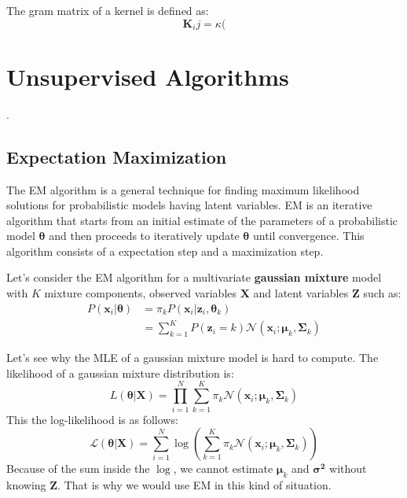 \documentclass[12pt]{report}
\begin{document}
        The gram matrix of a kernel is defined as:
        \begin{equation}
            \boldsymbol{K}_ij = \kappa(
        \end{equation}
            
        
    \section{Unsupervised Algorithms}. 
        \subsection{Expectation Maximization}
            The EM algorithm is a general technique for finding maximum likelihood solutions for probabilistic models having latent variables. EM is an iterative algorithm that starts from an initial estimate of the parameters of a probabilistic model $\boldsymbol{\theta}$ and then proceeds to iteratively update $\boldsymbol{\theta}$ until convergence. This algorithm consists of a expectation step and a maximization step.
            
            Let's consider the EM algorithm for a multivariate \textbf{gaussian mixture} model with $K$ mixture components, observed variables $\boldsymbol{X}$ and latent variables $\boldsymbol{Z}$ such as:
            \begin{align}
                P(\boldsymbol{x}_i | \boldsymbol{\theta}) &= \pi_k P(\boldsymbol{x}_i | \boldsymbol{z}_i, \boldsymbol{\theta}_k)\\
                &= \sum_{k=1}^{K} P(\boldsymbol{z}_i = k) \mathcal{N}(\boldsymbol{x}_i; \boldsymbol{\mu}_k, \boldsymbol{\Sigma}_k)
            \end{align}
            
            Let's see why the MLE of a gaussian mixture model is hard to compute. The likelihood of a gaussian mixture distribution is:
            \begin{equation}
                L(\boldsymbol{\theta} | \boldsymbol{X}) = \prod_{i=1}^N\sum_{k=1}^{K} \pi_k \mathcal{N}(\boldsymbol{x}_i; \boldsymbol{\mu}_k, \boldsymbol{\Sigma}_k)
            \end{equation}
            This the log-likelihood is as follows:
            \begin{equation}
                \mathcal{L}(\boldsymbol{\theta} | \boldsymbol{X}) = \sum_{i=1}^N \log\left(\sum_{k=1}^{K} \pi_k \mathcal{N}(\boldsymbol{x}_i; \boldsymbol{\mu}_k, \boldsymbol{\Sigma}_k)\right)
            \end{equation}
            Because of the sum inside the $\log$, we cannot estimate $\boldsymbol{\mu}_k$ and $\boldsymbol{\sigma^2}$ without knowing $\boldsymbol{Z}$. That is why we would use EM in this kind of situation.
            
\end{document}
